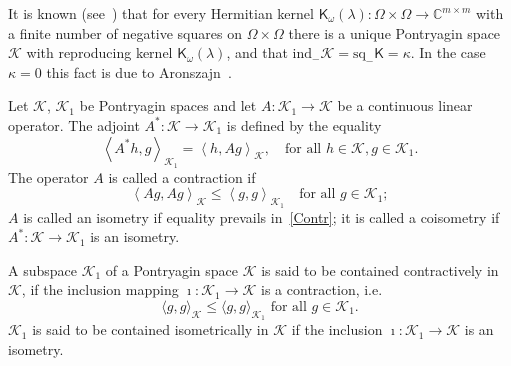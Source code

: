 \documentclass[12pt,twoside,a4paper]{amsart}
\theoremstyle{definition}
\numberwithin{equation}{section}
\begin{document}
It is known (see~\cite{Sch}) that for every Hermitian kernel
${\mathsf K}_\omega
(\lambda):\Omega\times\Omega\to{{\mathbb C}}^{m\times m}$ with a finite number of
negative squares
on $\Omega\times\Omega$ there is a unique Pontryagin space ${{\mathcal K}}$ with
reproducing kernel
${\mathsf K}_\omega (\lambda)$, and that $\mbox{ind}_-{{\mathcal K}} =\mbox{sq}_-{\mathsf
K}=\kappa$. In the case $\kappa=0$ this fact is due to Aronszajn~\cite{Ar50}.

Let ${{\mathcal K}}$, ${{\mathcal K}}_1$ be Pontryagin spaces and let $A:{{\mathcal K}}_1\to{{\mathcal K}}$ be
a continuous linear operator. The adjoint $A^*:{{\mathcal K}}\to{{\mathcal K}}_1$ is
defined by the equality
\[
\left<A^*h,g\right>_{{{\mathcal K}}_1}=\left<h,Ag\right>_{{\mathcal K}},\quad \mbox{for
all }h\in{{\mathcal K}},g\in{{\mathcal K}}_1.
\]
The operator $A$ is called a contraction if
\begin{equation}\label{Contr}
\left<Ag,Ag\right>_{{\mathcal K}}\le\left<g,g\right>_{{{\mathcal K}}_1} \quad \mbox{for
all }g\in{{\mathcal K}}_1;
\end{equation}
$A$ is called an isometry if equality prevails
 in~\eqref{Contr}; it is called a coisometry  if
 $A^*:{{\mathcal K}}\to{{\mathcal K}}_1$ is an isometry.

A  subspace ${{\mathcal K}}_1$ of a Pontryagin space ${{\mathcal K}}$ is said to be contained
contractively in ${{\mathcal K}}$, if the inclusion mapping $\imath:{{\mathcal K}}_1\to{{\mathcal K}}$ is a
contraction, i.e.
\[
\langle g,g\rangle_{{\mathcal K}}\le \langle g,g\rangle_{{{\mathcal K}}_1} \mbox{ for all }g\in{{\mathcal K}}_1.
\]
${{\mathcal K}}_1$
is said to be contained isometrically in ${{\mathcal K}}$ if the inclusion
$\imath:{{\mathcal K}}_1\to{{\mathcal K}}$  is an isometry.
\end{document}
